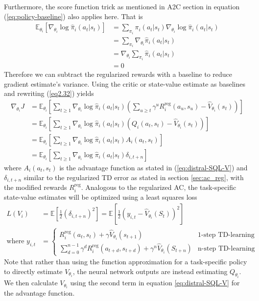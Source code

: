 \documentclass[12pt]{report}
\begin{document}
Furthermore, the score function trick as mentioned in A2C section in equation (\ref{eq:policy-baseline}) also applies here. That is
\begin{align}
    \mathbb{E}_{\theta_i}\left[\nabla_{\theta_i}\log \hat{\pi}_i(a_t|s_t)\right]&=\sum_{\pi_i}\pi_i(a_t|s_t)\nabla_{\theta_i}\log\hat{\pi}_i(a_t|s_t)\nonumber\\
    &=\sum_{\pi_i} \nabla_{\theta_i}\hat{\pi}_i(a_t|s_t)\nonumber\\
    &=\nabla_{\theta_i}\sum_{\pi_i}\hat{\pi}_i(a_t|s_t)\nonumber\\
    &=0\nonumber
\end{align}
Therefore we can subtract the regularized rewards with a baseline to reduce gradient estimate's variance. Using the critic or state-value estimate as baselines and rewriting (\ref{eq2.32}) yields
\begin{align}
    \nabla_{\theta_i}J &= \mathbb{E}_{\theta_i}\left[\sum_{t\ge1}\nabla_{\theta_i}\log \hat{\pi}_i(a_t|s_t)\left(\sum_{u\ge t}\gamma^u R_i^{\text{reg}}(a_u,s_u) - \hat{V}_{\theta_i}(s_t)\right)\right]\nonumber\\
    &= \mathbb{E}_{\theta_i}\left[\sum_{t\ge1}\nabla_{\theta_i}\log \hat{\pi}_i(a_t|s_t)\left(Q_i(a_t,s_t)- \hat{V}_{\theta_i}(s_t)\right)\right]\nonumber\\
    &= \mathbb{E}_{\theta_i}\left[\sum_{t\ge1}\nabla_{\theta_i}\log \hat{\pi}_i(a_t|s_t)A_i(a_t,s_t)\right]\\
    &= \mathbb{E}_{\theta_i}\left[\sum_{t\ge1}\nabla_{\theta_i}\log \hat{\pi}_i(a_t|s_t)\delta_{i,t+n}\right]\label{eq2.35}
\end{align}
where $A_i(a_t,s_t)$ is the advantage function as stated in (\ref{eq:distral-SQL-V}) and $\delta_{i,t+n}$ similar to the regularized TD error as stated in section \ref{sec:ac_reg}, with the modified rewards $R_i^{\text{reg}}$. Analogous to the regularized AC, the task-specific state-value estimates will be optimized using a least squares loss 
\begin{align}
    L(V_i) &= \mathbb{E}\left[\frac{1}{2}(\delta_{i,t+n})^2\right]=\mathbb{E}\left[\frac{1}{2}\left(y_{i,t}-\hat{V}_{\theta_i}(S_t)\right)^2\right]\\
    \text{where } y_{i,t} &= \begin{cases} R_i^{\text{reg}}(a_t,s_t) + \gamma \hat{V}_{\theta_i}(s_{t+1})&\mbox{1-step TD-learning} \\
    \sum_{d=0}^{n-1} \gamma^d R_i^{\text{reg}}(a_{t+d},s_{t+d}) + \gamma^n \hat{V}_{\theta_i}(S_{t+n}) & \mbox{n-step TD-learning} \end{cases}
\end{align}
Note that rather than using the function approximation for a task-specific policy to directly estimate $V_{\theta_i}$, the neural network outputs are instead estimating $Q_{\theta_i}$. We then calculate $V_{\theta_i}$ using the second term in equation \ref{eq:distral-SQL-V} for the advantage function.\\
\end{document}
